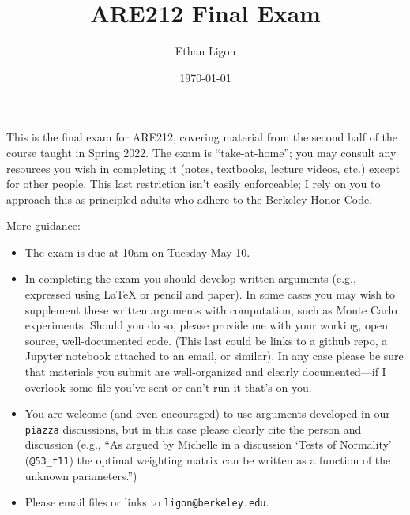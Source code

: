 \documentclass[12pt]{amsart}
\author{Ethan Ligon}
\date{\today}
\title{ARE212 Final Exam}
\begin{document}
\maketitle

This is the final exam for ARE212, covering material from the second
half of the course taught in Spring 2022.   The exam is
``take-at-home''; you may consult any resources you wish in completing
it (notes, textbooks, lecture videos, etc.) except for other
people.  This last restriction isn't easily enforceable; I rely on
you to approach this as principled adults who adhere to the
Berkeley Honor Code.

More guidance:
\begin{itemize}
\item The exam is due at 10am  on Tuesday May 10.
\item In completing the exam you should develop written arguments
(e.g., expressed using \LaTeX{} or pencil and paper).  In some cases
you may wish to supplement these written arguments with
computation, such as Monte Carlo experiments.  Should you do so,
please provide me with your working, open source, well-documented code.  (This
last could be links to a github repo, a Jupyter notebook attached
to an email, or similar).  In any case please be sure that
materials you submit are well-organized and clearly
documented---if I overlook some file you've sent or can't run it
that's on you.
\item You are welcome (and even encouraged) to use arguments developed
in our \texttt{piazza} discussions, but in this case please clearly cite
the person and discussion (e.g., ``As argued by Michelle in a
discussion `Tests of Normality' (\texttt{@53\_f11}) the optimal weighting
matrix can be written as a function of the unknown parameters.'')
\item Please email files or links to \texttt{ligon@berkeley.edu}.
\end{itemize}
\end{document}
